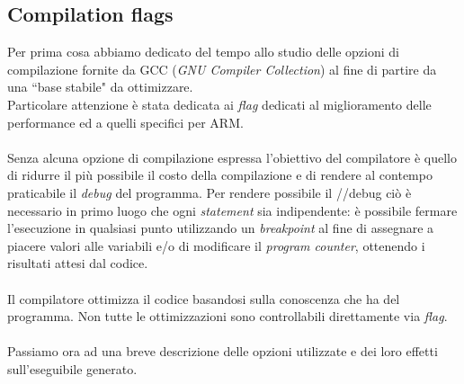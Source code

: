\subsection{Compilation flags}
Per prima cosa abbiamo dedicato del tempo allo studio delle opzioni di 
compilazione fornite da GCC (\emph{GNU Compiler Collection}) al fine di partire 
da una ``base stabile" da ottimizzare.\\
Particolare attenzione è stata dedicata ai \emph{flag} dedicati al 
miglioramento delle performance ed a quelli specifici per ARM.\\
\\
Senza alcuna opzione di compilazione espressa l'obiettivo del compilatore è 
quello di ridurre il più possibile il costo della compilazione e di rendere al 
contempo praticabile il \emph{debug} del programma. Per rendere possibile il 
//debug ciò è necessario in primo luogo che ogni \emph{statement} sia 
indipendente: è possibile fermare l'esecuzione in qualsiasi punto utilizzando 
un \emph{breakpoint} al fine di assegnare a piacere valori alle variabili e/o 
di modificare il \emph{program counter}, ottenendo i risultati attesi dal 
codice.\\
\\
Il compilatore ottimizza il codice basandosi sulla conoscenza che ha del 
programma. Non tutte le ottimizzazioni sono controllabili direttamente via 
\emph{flag}.\\
\\
Passiamo ora ad una breve descrizione delle opzioni utilizzate e dei loro 
effetti sull'eseguibile generato.

